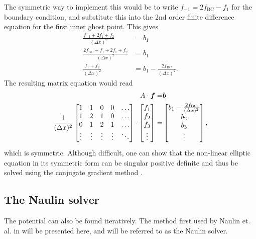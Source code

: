 The symmetric way to implement this would be to write $f_{-1}=2f_{\text{BC}}-f_{1}$ for the boundary condition, and substitute this into the 2nd order finite difference equation for the first inner ghost point.
This gives
%
\begin{align*}
    \frac{f_{-1}+2f_{1}+f_{2}}{(\Delta x)^2}&=b_1\\
    \frac{2f_{\text{BC}}-f_{1}+2f_{1}+f_{2}}{(\Delta x)^2}&=b_1\\
    \frac{f_{1}+f_{2}}{(\Delta x)^2}&=b_1 - \frac{2f_{\text{BC}}}{(\Delta x)^2}.
\end{align*}
%
The resulting matrix equation would read
%
\begin{align*}
    A\cdot\boldsymbol{f}=&\boldsymbol{b}\\
    \frac{1}{(\Delta x)^2}
    \begin{bmatrix}
        1                       & 1                       & 0 & 0 & \ldots\\
        1                       & 2                       & 1 & 0 & \ldots\\
        0                       & 1                       & 2 & 1 & \ldots\\
        \vdots                  & \vdots              &\vdots&\vdots&\ddots\\
    \end{bmatrix}
    \cdot
    \begin{bmatrix}
        f_{1}\\
        f_{2}\\
        f_{3}\\
        \vdots
    \end{bmatrix}
    =&
    \begin{bmatrix}
        b_{1} - \frac{2f_{\text{BC}}}{(\Delta x)^2}\\
        b_{2}\\
        b_{3}\\
        \vdots
    \end{bmatrix},
\end{align*}
%
which is symmetric.
Although difficult, one can show that the non-linear elliptic equation in its symmetric form can be singular positive definite and thus be solved using the conjugate gradient method \cite{Saad2003book}.

\subsection{The Naulin solver}
\label{sec:NaulinSolver}
%
The potential can also be found iteratively.
The method first used by Naulin et. al. in \cite{Naulin2008} will be presented here, and will be referred to as the Naulin solver.

